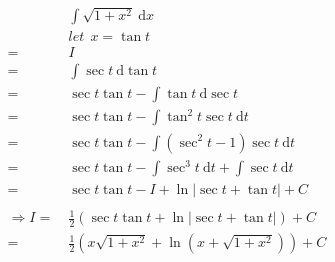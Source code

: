 \documentclass{article}
\begin{document}
	\large
	\setlength{\baselineskip}{3em}
	
	\renewcommand{\d}[1][x]{\ \text{d}#1}
	
	\begin{align*}
		&\ \int \sqrt{1 + x^2} \d
		\\
		&\ let\ \ x = \tan{t}
		\\
		= &\ I
		\\
		= &\ \int \sec{t} \d[\tan{t}]
		\\
		= &\ \sec{t} \tan{t} - \int \tan{t} \d[\sec{t}]
		\\
		= &\ \sec{t} \tan{t} - \int \tan^2{t} \sec{t} \d[t]
		\\
		= &\ \sec{t} \tan{t} - \int (\sec^2{t} - 1) \sec{t} \d[t]
		\\
		= &\ \sec{t} \tan{t} - \int \sec^3{t} \d[t] + \int \sec{t} \d[t]
		\\
		= &\ \sec{t} \tan{t} - I + \ln{|\sec{t} + \tan{t}|} + C
		\\
		\\
		\Rightarrow I = &\ \frac{1}{2} (\sec{t} \tan{t} + \ln{|\sec{t} + \tan{t}|}) + C
		\\
		= &\ \frac{1}{2} (x \sqrt{1 + x^2} + \ln{(x + \sqrt{1 + x^2})}) + C 
	\end{align*}
\end{document}
